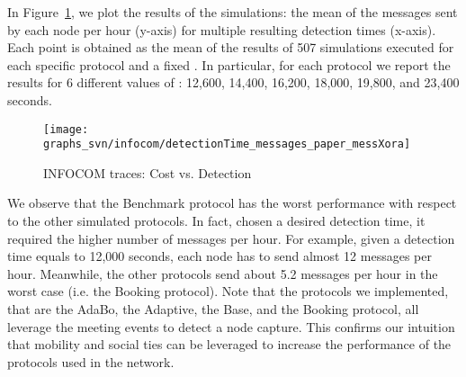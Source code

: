\documentclass{IEEEconf}
\begin{document}
In Figure~\ref{fig:infocom_detectTime_messages}, we plot the results of the simulations: the mean of the messages sent by each node per hour (y-axis) for multiple resulting detection times (x-axis). Each point is obtained as the mean of the results of 507 simulations executed for each specific protocol and a fixed . In particular, for each protocol we report the results for 6 different values of : 12,600, 14,400, 16,200, 18,000, 19,800, and 23,400 seconds.

\begin{figure}[hbt]
\begin{center}
	\texttt{[image: graphs\_svn/infocom/detectionTime\_messages\_paper\_messXora]}
\end{center}
\caption{INFOCOM traces: Cost vs. Detection}
\label{fig:infocom_detectTime_messages}
\end{figure}

We observe that the Benchmark protocol has the worst performance with respect to the other simulated protocols. In fact, chosen a desired detection time, it required the higher number of messages per hour. For example, given a detection time equals to 12,000 seconds, each node has to send almost 12 messages per hour. Meanwhile, the other protocols send about 5.2 messages per hour in the worst case (i.e. the Booking protocol). Note that the protocols we implemented, that are the AdaBo, the Adaptive, the Base, and the Booking protocol, all leverage the meeting events to detect a node capture. This confirms our intuition that mobility and
social ties can be leveraged to increase the performance of the protocols used in the network.
\end{document}
